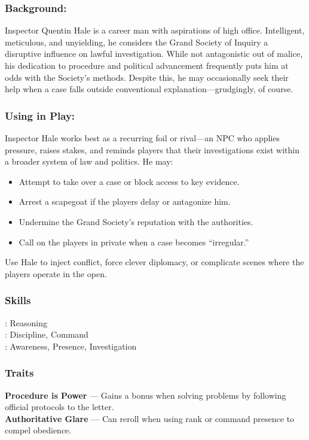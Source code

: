     \begin{paracol}{3}
        \subsubsection*{Background:}
        Inspector Quentin Hale is a career man with aspirations of high office. Intelligent, meticulous, and unyielding, he considers the Grand Society of Inquiry a disruptive influence on lawful investigation. While not antagonistic out of malice, his dedication to procedure and political advancement frequently puts him at odds with the Society’s methods. Despite this, he may occasionally seek their help when a case falls outside conventional explanation—grudgingly, of course.
        
        \switchcolumn
        \subsubsection*{Using in Play:}
        Inspector Hale works best as a recurring foil or rival—an NPC who applies pressure, raises stakes, and reminds players that their investigations exist within a broader system of law and politics. He may:
        \begin{itemize}
          \item Attempt to take over a case or block access to key evidence.
          \item Arrest a scapegoat if the players delay or antagonize him.
          \item Undermine the Grand Society’s reputation with the authorities.
          \item Call on the players in private when a case becomes “irregular.”
        \end{itemize}
        Use Hale to inject conflict, force clever diplomacy, or complicate scenes where the players operate in the open.
        
        \switchcolumn      
        \subsubsection{Skills}
            \noindent\Expert: Reasoning \\
            \noindent\Skilled: Discipline, Command \\
            \noindent\Novice: Awareness, Presence, Investigation \\
        \subsubsection{Traits}
            \textbf{Procedure is Power} — Gains a bonus when solving problems by following official protocols to the letter.\\
            \noindent\textbf{Authoritative Glare} — Can reroll when using rank or command presence to compel obedience.\\
    \end{paracol}

